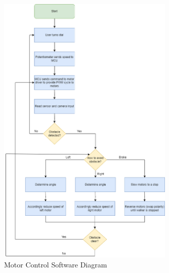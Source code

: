 \begin{figure}[H]
	\centering
	\includegraphics[width=0.75\textwidth]{./Images/motorsw.drawio.png}
	\caption{\label{fig:motorsw}Motor Control Software Diagram}
\end{figure}


